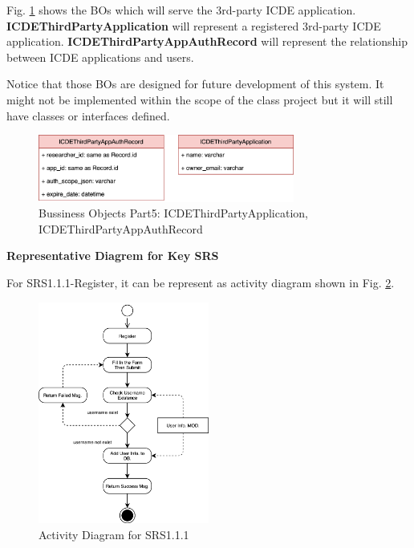 Fig. \ref{fig:bo_classes_6} shows the BOs which will serve the 3rd-party ICDE application. 
\textbf{ICDEThirdPartyApplication} will represent a registered 3rd-party ICDE application.
\textbf{ICDEThirdPartyAppAuthRecord} will represent the relationship between ICDE applications and users.

Notice that those BOs are designed for future development of this system. It might not be implemented within the scope of the class project but it will still have classes or interfaces defined.

\begin{figure}[t]
	\centering
	\includegraphics[width=0.75\textwidth]{./img/bo_classes_6.png}
	\caption{Bussiness Objects Part5: ICDEThirdPartyApplication, ICDEThirdPartyAppAuthRecord}
	
	\label{fig:bo_classes_6}
\end{figure}

\textbf{Representative Diagrem for Key SRS}

For SRS1.1.1-Register, it can be represent as activity diagram shown in Fig. \ref{fig:srs_diagram_1}.

\begin{figure}[t]
	\centering
	\includegraphics[width=0.5\textwidth]{./img/srs_diagram_1.png}
	\caption{Activity Diagram for SRS1.1.1}
	
	\label{fig:srs_diagram_1}
\end{figure}

